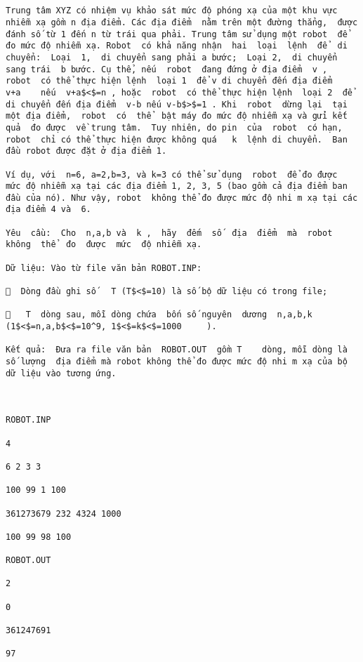 
\begin{verbatim}


Trung tâm XYZ có nhiệm vụ khảo sát mức độ phóng xạ của một khu vực nhiễm xạ gồm n địa điểm. Các địa điểm  nằm trên một đường thẳng,  được đánh số từ 1 đến n từ trái qua phải. Trung tâm sử dụng một robot  để đo mức độ nhiễm xạ. Robot  có khả năng nhận  hai  loại  lệnh  để  di chuyển:  Loại  1,  di chuyển sang phải a bước;  Loại 2,  di chuyển sang trái  b bước. Cụ thể, nếu  robot  đang đứng ở địa điểm  v ,  robot  có thể thực hiện lệnh  loại 1  để v di chuyển đến địa điểm  v+a    nếu  v+a$<$=n , hoặc  robot  có thể thực hiện lệnh  loại 2  để di chuyển đến địa điểm  v-b nếu v-b$>$=1 . Khi  robot  dừng lại  tại một địa điểm,  robot  có  thể  bật máy đo mức độ nhiễm xạ và gửi kết quả  đo được  về trung tâm.  Tuy nhiên, do pin  của  robot  có hạn,  robot  chỉ có thể thực hiện được không quá   k  lệnh di chuyển.  Ban đầu robot được đặt ở địa điểm 1.

Ví dụ, với  n=6, a=2,b=3, và k=3 có thể sử dụng  robot  để đo được  mức độ nhiễm xạ tại các địa điểm 1, 2, 3, 5 (bao gồm cả địa điểm ban  đầu của nó). Như vậy, robot  không thể đo được mức độ nhi m xạ tại các địa điểm 4 và  6.

Yêu  cầu:  Cho  n,a,b và  k ,  hãy  đếm  số  địa  điểm  mà  robot  không  thể  đo  được  mức  độ nhiễm xạ.

Dữ liệu: Vào từ file văn bản ROBOT.INP:

  Dòng đầu ghi số   T (T$<$=10) là số bộ dữ liệu có trong file;

   T  dòng sau, mỗi dòng chứa  bốn số nguyên  dương  n,a,b,k       (1$<$=n,a,b$<$=10^9, 1$<$=k$<$=1000     ).

Kết quả:  Đưa ra file văn bản  ROBOT.OUT  gồm T    dòng, mỗi dòng là số lượng  địa điểm mà robot không thể đo được mức độ nhi m xạ của bộ dữ liệu vào tương ứng.

 

ROBOT.INP 

4

6 2 3 3

100 99 1 100

361273679 232 4324 1000

100 99 98 100

ROBOT.OUT

2

0

361247691

97\end{verbatim}